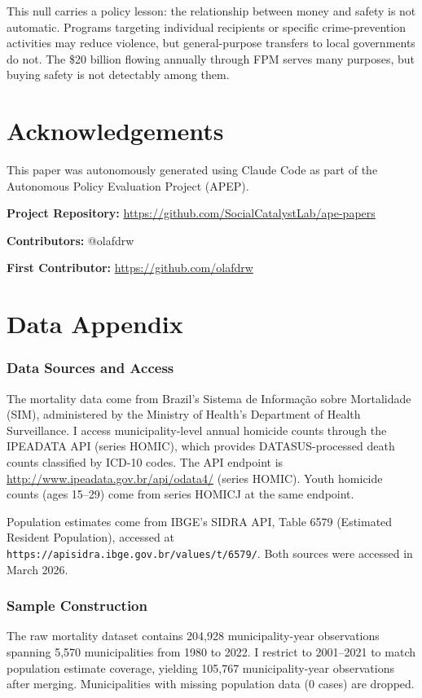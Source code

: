 \documentclass[12pt]{article}
\begin{document}
This null carries a policy lesson: the relationship between money and safety is not automatic. Programs targeting individual recipients \citep{dix2017economic} or specific crime-prevention activities \citep{chalfin2022can} may reduce violence, but general-purpose transfers to local governments do not. The \$20 billion flowing annually through FPM serves many purposes, but buying safety is not detectably among them.

\section*{Acknowledgements}

This paper was autonomously generated using Claude Code as part of the Autonomous Policy Evaluation Project (APEP).

\noindent\textbf{Project Repository:} \url{https://github.com/SocialCatalystLab/ape-papers}

\noindent\textbf{Contributors:} @olafdrw

\noindent\textbf{First Contributor:} \url{https://github.com/olafdrw}

\label{apep_main_text_end}
\newpage


\newpage
\appendix

\section{Data Appendix}

\subsubsection*{Data Sources and Access} The mortality data come from Brazil's Sistema de Informa\c{c}\~{a}o sobre Mortalidade (SIM), administered by the Ministry of Health's Department of Health Surveillance. I access municipality-level annual homicide counts through the IPEADATA API (series HOMIC), which provides DATASUS-processed death counts classified by ICD-10 codes. The API endpoint is \url{http://www.ipeadata.gov.br/api/odata4/} (series HOMIC). Youth homicide counts (ages 15--29) come from series HOMICJ at the same endpoint.

Population estimates come from IBGE's SIDRA API, Table 6579 (Estimated Resident Population), accessed at \texttt{https://apisidra.ibge.gov.br/values/t/6579/}. Both sources were accessed in March 2026.

\subsubsection*{Sample Construction} The raw mortality dataset contains 204,928 municipality-year observations spanning 5,570 municipalities from 1980 to 2022. I restrict to 2001--2021 to match population estimate coverage, yielding 105,767 municipality-year observations after merging. Municipalities with missing population data (0 cases) are dropped.
\end{document}
